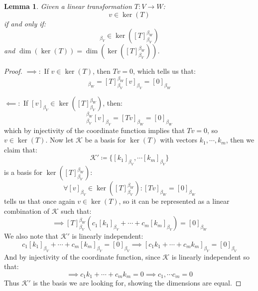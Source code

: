 \documentclass[10pt,letterpaper]{article} %
\newtheorem{lem}{Lemma}[section]
\begin{document}
\begin{lem}
Given a linear transformation $T: V \xrightarrow{} W$:
\begin{equation*}
v \in \ker(T)
\end{equation*}
if and only if:
\begin{equation*}
[v]_{\beta_V} \in \ker([T]_{\beta_V}^{\beta_W})
\end{equation*}
and $\dim(\ker(T)) = \dim(\ker([T]_{\beta_V}^{\beta_W}))$.
\end{lem}
\begin{proof}
$\implies:$ If $v \in \ker(T)$, then $Tv = 0$, which tells us that:
\begin{equation*}
[Tv]_{\beta_W} = [T]_{\beta_V}^{\beta_W}[v]_{\beta_V} = [0]_{\beta_W}
\end{equation*}

$\impliedby:$ If $[v]_{\beta_V} \in \ker([T]_{\beta_V}^{\beta_W})$, then:
\begin{equation*}
[T]_{\beta_V}^{\beta_W}[v]_{\beta_V} = [Tv]_{\beta_W} = [0]_{\beta_W}
\end{equation*}
which by injectivity of the coordinate function implies that $Tv = 0$, so $v \in \ker(T)$. Now let $\mathcal{K}$ be a basis for $\ker(T)$ with vectors $k_1, \cdots, k_m$, then we claim that:
\begin{equation*}
\mathcal{K}' \coloneq \{[k_1]_{\beta_V}, \cdots [k_m]_{\beta_V}\}
\end{equation*}
is a basis for $\ker([T]_{\beta_V}^{\beta_W})$:
\begin{equation*}
\forall [v]_{\beta_V} \in \ker([T]_{\beta_V}^{\beta_W}): [Tv]_{\beta_W} = [0]_{\beta_W}
\end{equation*}
tells us that once again $v \in \ker(T)$, so it can be represented as a linear combination of $\mathcal{K}$ such that:
\begin{equation*}
\implies [T]_{\beta_V}^{\beta_W}(c_1[k_1]_{\beta_V} + \cdots + c_m[k_m]_{\beta_V}) = [0]_{\beta_W}
\end{equation*}
We also note that $\mathcal{K}'$ is linearly independent:
\begin{equation*}
c_1[k_1]_{\beta_V} + \cdots + c_m[k_m]_{\beta_V} = [0]_{\beta_V} \implies [c_1k_1 + \cdots + c_mk_m]_{\beta_V} = [0]_{\beta_V}
\end{equation*}
And by injectivity of the coordinate function, since $\mathcal{K}$ is linearly independent so that:
\begin{equation*}
\implies c_1k_1 + \cdots + c_mk_m = 0 \implies c_1, \cdots c_m = 0
\end{equation*}
Thus $\mathcal{K}'$ is the basis we are looking for, showing the dimensions are equal. 
\end{proof}
\end{document}
